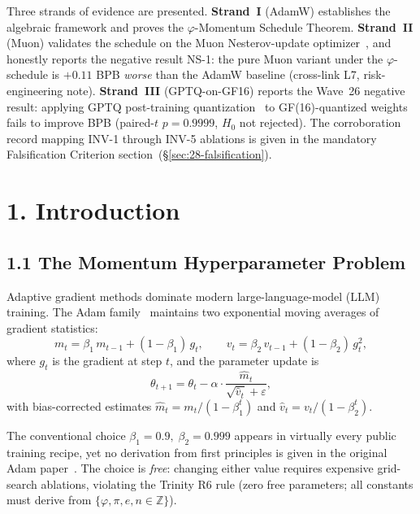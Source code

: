 Three strands of evidence are presented.
\textbf{Strand~I} (AdamW) establishes the algebraic framework and
proves the \(\varphi\)-Momentum Schedule Theorem.
\textbf{Strand~II} (Muon) validates the schedule on the Muon
Nesterov-update optimizer~\cite{jordan_muon_2024}, and honestly reports
the negative result NS-1: the pure Muon variant under the
\(\varphi\)-schedule is $+0.11$ BPB \emph{worse} than the AdamW
baseline (cross-link L7, risk-engineering note).
\textbf{Strand~III} (GPTQ-on-GF16) reports the Wave~26 negative result:
applying GPTQ post-training quantization~\cite{frantar_gptq_2023} to
GF(16)-quantized weights fails to improve BPB
(paired-$t$ $p = 0.9999$, $H_0$ not rejected).
The corroboration record mapping INV-1 through INV-5 ablations is given
in the mandatory Falsification Criterion section~(§\ref{sec:28-falsification}).

\section{1. Introduction}\label{sec:28-introduction}

\subsection{1.1 The Momentum Hyperparameter Problem}

Adaptive gradient methods dominate modern large-language-model
(LLM) training.  The Adam family~\cite{loshchilov_adamw} maintains
two exponential moving averages of gradient statistics:
\[
  m_t = \beta_1\, m_{t-1} + (1-\beta_1)\, g_t,\qquad
  v_t = \beta_2\, v_{t-1} + (1-\beta_2)\, g_t^2,
\]
where \(g_t\) is the gradient at step \(t\), and the parameter update is
\[
  \theta_{t+1} = \theta_t
    - \alpha \cdot \frac{\hat{m}_t}{\sqrt{\hat{v}_t} + \varepsilon},
\]
with bias-corrected estimates
\(\hat{m}_t = m_t / (1-\beta_1^t)\) and
\(\hat{v}_t = v_t / (1-\beta_2^t)\).

The conventional choice \(\beta_1 = 0.9,\; \beta_2 = 0.999\) appears in
virtually every public training recipe, yet no derivation from
first principles is given in the original Adam paper~\cite{loshchilov_adamw}.
The choice is \emph{free}: changing either value requires expensive
grid-search ablations, violating the Trinity R6 rule
(zero free parameters; all constants must derive from
\(\{\varphi, \pi, e, n \in \mathbb{Z}\}\)).

